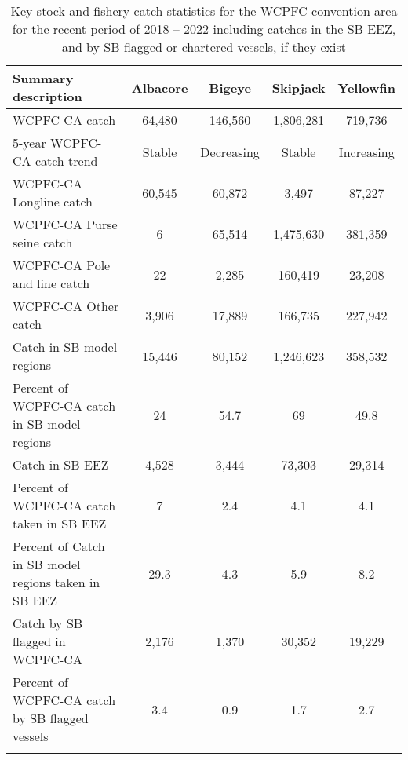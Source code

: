 \begin{longtable}{lcccc}
\caption{Key stock and fishery catch statistics for the WCPFC convention area for the recent period of 2018 -- 2022 including catches in the SB EEZ, and by SB flagged or chartered vessels, if they exist} \\ 
  \hline
Summary description & Albacore & Bigeye & Skipjack & Yellowfin \\ 
  \hline
WCPFC-CA catch & 64,480 & 146,560 & 1,806,281 & 719,736 \\ 
  5-year WCPFC-CA catch trend & Stable & Decreasing & Stable & Increasing \\ 
  WCPFC-CA Longline catch & 60,545 & 60,872 & 3,497 & 87,227 \\ 
  WCPFC-CA Purse seine catch & 6 & 65,514 & 1,475,630 & 381,359 \\ 
  WCPFC-CA Pole and line catch & 22 & 2,285 & 160,419 & 23,208 \\ 
  WCPFC-CA Other catch & 3,906 & 17,889 & 166,735 & 227,942 \\ 
  Catch in SB model regions & 15,446 & 80,152 & 1,246,623 & 358,532 \\ 
  Percent of WCPFC-CA catch in SB model regions & 24 & 54.7 & 69 & 49.8 \\ 
   \hline
Catch in SB EEZ & 4,528 & 3,444 & 73,303 & 29,314 \\ 
  Percent of WCPFC-CA catch taken in SB EEZ & 7 & 2.4 & 4.1 & 4.1 \\ 
  Percent of Catch in SB model regions taken in SB EEZ & 29.3 & 4.3 & 5.9 & 8.2 \\ 
  Catch by SB flagged in WCPFC-CA & 2,176 & 1,370 & 30,352 & 19,229 \\ 
  Percent of WCPFC-CA catch by SB flagged vessels & 3.4 & 0.9 & 1.7 & 2.7 \\ 
  \hline
\label{cat_sum_tab}
\end{longtable}
